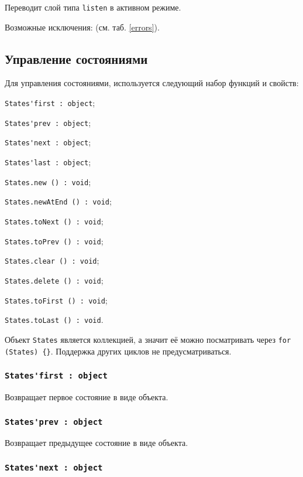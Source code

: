 Переводит слой типа \lstinline|listen| в активном режиме.

Возможные исключения:  (см. таб. \ref{errors}).

\subsection{Управление состояниями}

Для управления состояниями, используется следующий набор функций и свойств:
\begin{icItems}
	\item \lstinline|States'first : object|;
	\item \lstinline|States'prev : object|;
	\item \lstinline|States'next : object|;
	\item \lstinline|States'last : object|;
	\item \lstinline|States.new () : void|;
	\item \lstinline|States.newAtEnd () : void|;
	\item \lstinline|States.toNext () : void|;
	\item \lstinline|States.toPrev () : void|;
	\item \lstinline|States.clear () : void|;
	\item \lstinline|States.delete () : void|;
	\item \lstinline|States.toFirst () : void|;
	\item \lstinline|States.toLast () : void|.
\end{icItems}

Объект \lstinline|States| является коллекцией, а значит её можно посматривать через \lstinline|for (States) {}|. Поддержка других циклов не предусматриваться.

\subsubsection{\lstinline|States'first : object|}

Возвращает первое состояние в виде объекта.

\subsubsection{\lstinline|States'prev : object|}

Возвращает предыдущее состояние в виде объекта.

\subsubsection{\lstinline|States'next : object|}

